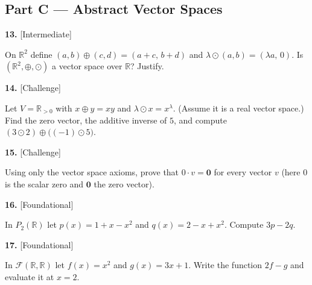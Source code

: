 \documentclass[11pt]{article}
\begin{document}
\subsection*{\normalsize\color{ink} Part C --- Abstract Vector Spaces}
\begin{minipage}{\linewidth}\textbf{13.} \hfill{\scriptsize\color{ink}[Intermediate]}\par\nopagebreak On $\mathbb{R}^{2}$ define $(a,b)\oplus(c,d)=(a+c,\,b+d)$ and $\lambda\odot(a,b)=(\lambda a,\,0)$. Is $(\mathbb{R}^{2},\oplus,\odot)$ a vector space over $\mathbb{R}$? Justify.
\vspace{3.4cm}\end{minipage}\par\vspace{4pt}
\begin{minipage}{\linewidth}\textbf{14.} \hfill{\scriptsize\color{ink}[Challenge]}\par\nopagebreak Let $V=\mathbb{R}_{>0}$ with $x\oplus y=xy$ and $\lambda\odot x=x^{\lambda}$. (Assume it is a real vector space.) Find the zero vector, the additive inverse of $5$, and compute $(3\odot2)\oplus\big((-1)\odot5\big)$.
\vspace{5.0cm}\end{minipage}\par\vspace{4pt}
\begin{minipage}{\linewidth}\textbf{15.} \hfill{\scriptsize\color{ink}[Challenge]}\par\nopagebreak Using only the vector space axioms, prove that $0\cdot v=\mathbf 0$ for every vector $v$ (here $0$ is the scalar zero and $\mathbf 0$ the zero vector).
\vspace{5.0cm}\end{minipage}\par\vspace{4pt}
\begin{minipage}{\linewidth}\textbf{16.} \hfill{\scriptsize\color{ink}[Foundational]}\par\nopagebreak In $P_{2}(\mathbb{R})$ let $p(x)=1+x-x^{2}$ and $q(x)=2-x+x^{2}$. Compute $3p-2q$.
\vspace{2.6cm}\end{minipage}\par\vspace{4pt}
\begin{minipage}{\linewidth}\textbf{17.} \hfill{\scriptsize\color{ink}[Foundational]}\par\nopagebreak In $\mathcal F(\mathbb{R},\mathbb{R})$ let $f(x)=x^{2}$ and $g(x)=3x+1$. Write the function $2f-g$ and evaluate it at $x=2$.
\vspace{2.6cm}\end{minipage}\par\vspace{4pt}
\end{document}
